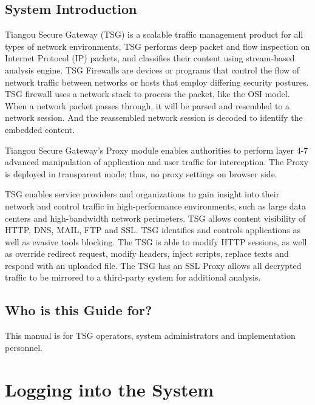 \subsection*{\hypertarget{link:System Introduction}{System Introduction}}
\label{sec:intro:overview:introduction}

Tiangou Secure Gateway (TSG) is a scalable traffic management product for all types of network environments. 
TSG performs deep packet and flow inspection on Internet Protocol (IP) packets, and classifies their content using stream-based analysis engine. 
TSG Firewalls are devices or programs that control the flow of network traffic between networks or hosts that employ differing security postures. 
TSG firewall uses a network stack to process the packet, like the OSI model. When a network packet passes through, it will be parsed and resembled to a network session. 
And the reassembled network session is decoded to identify the embedded content.


Tiangou Secure Gateway’s Proxy module enables authorities to perform layer 4-7 advanced manipulation of application and user traffic for interception. 
The Proxy is deployed in transparent mode; thus, no proxy settings on browser side.


TSG enables service providers and organizations to gain insight into their network and control traffic in high-performance environments, 
such as large data centers and high-bandwidth network perimeters. TSG allows content visibility of HTTP, DNS, MAIL, FTP and SSL. 
TSG identifies and controls applications as well as evasive tools blocking. The TSG is able to modify HTTP sessions, as well as override redirect request, 
modify headers, inject scripts, replace texts and respond with an uploaded file. 
The TSG has an SSL Proxy allows all decrypted traffic to be mirrored to a third-party system for additional analysis.


\subsection*{\hypertarget{link:Who is this Guide for}{Who is this Guide for?}}
\label{sec:intro:overview:for}

This manual is for TSG operators, system administrators and implementation personnel.


\section*{\hypertarget{link:Logging into the System}{Logging into the System}}
\label{sec:intro:logging}

